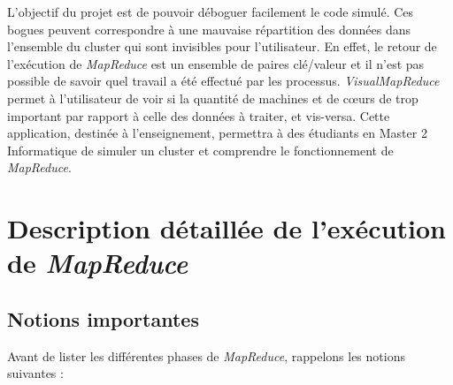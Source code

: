L'objectif du projet est de pouvoir déboguer facilement le code simulé.
Ces bogues peuvent correspondre à une mauvaise répartition des données dans l'ensemble du cluster qui sont invisibles pour l'utilisateur. En effet, le retour de l'exécution de {\it MapReduce} est un ensemble de paires clé/valeur et il n'est pas possible de savoir quel travail a été effectué par les processus. {\it VisualMapReduce} permet à l'utilisateur de voir si la quantité de machines et de cœurs de trop important par rapport à celle des données à traiter, et vis-versa.
Cette application, destinée à l'enseignement, permettra à des étudiants en Master 2 Informatique de simuler un cluster et comprendre le fonctionnement de {\it MapReduce}.

\section{Description détaillée de l'exécution de {\it MapReduce}}
\subsection{Notions importantes}

Avant de lister les différentes phases de {\it MapReduce}, rappelons les notions suivantes :

